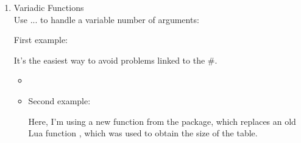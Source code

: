 \begin{enumerate}[label=(\alph*)]
The problem is the use of l'operator \% (Modulus Operator and remainder of after an integer division). The same problem occurs when using the string.format function and the \%d or \%i: placeholder for an integer.

One solution for these two cases is to define a macro  which replaces the \%.

\begin{verbatim}
 \makeatletter
 \let\pc\@percentchar
 \makeatother
\end{verbatim}

The code becomes :


\begin{verbatim}
\directlua{
 function divide_and_remainder(dividend, divisor)
   if divisor == 0 then
     tex.error("Error: Cannot divide by zero")
     return nil
   else
     local quotient = math.floor(dividend / divisor)
     local remainder = dividend \pc divisor
     return quotient, remainder
   end
 end 

local num1 = 17
local num2 = 5
local q, r = divide_and_remainder(num1, num2)

tex.sprint(string.format([[The quotient of \pc i divided by
 \pc i is: \pc i\\]], num1, num2, q))
tex.sprint(string.format([[The remainder is: \pc i]], r))}
\end{verbatim}

  \item Variadic Functions\\

Use ... to handle a variable number of arguments:

First example: 

It's the easiest way to avoid problems linked to the \#.

\begin{itemize}


  \item   \begin{tkzexample}[latex=.2\textwidth]
  \end{tkzexample}


\item   Second example: 

Here, I'm using a new function from the  package, which replaces an old Lua function , which was used to obtain the size of the table.


\end{itemize}
\end{enumerate}
